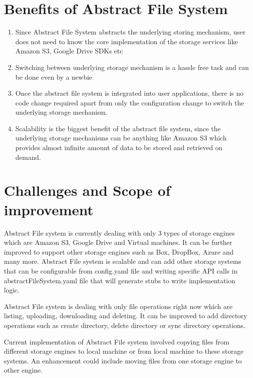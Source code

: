 \section{Benefits of Abstract File System}
\begin{enumerate}
    \item Since Abstract File System abstracts the underlying storing 
mechanism, user does not need to know the core implementation of the storage 
services like Amazon S3, Google Drive SDKs etc
    
    \item Switching between underlying storage mechanism is a hassle free task 
and can be done even by a newbie
    
    \item Once the abstract file system is integrated into user 
applications, there is no code change required apart from only the 
configuration change to switch the underlying storage mechanism.
    
    \item Scalability is the biggest benefit of the abstract file system, 
since the underlying storage mechanisms can be anything like Amazon S3 which 
provides almost infinite amount of data to be stored and retrieved on demand.
    
\end{enumerate}

\section{Challenges and Scope of improvement}
Abstract File system is currently dealing with only 3 types of storage engines 
which are Amazon S3, Google Drive and Virtual machines. It can be further 
improved to support other storage engines such as Box, DropBox, Azure and many 
more. Abstract File system is scalable and can add other storage systems that 
can be configurable from config.yaml file and writing specific API calls in 
abstractFileSystem.yaml file that will generate stubs to write implementation 
logic. 


Abstract File system is dealing with only file operations right now which are 
listing, uploading, downloading and deleting. It can be improved to add 
directory operations such as create directory, delete directory or sync 
directory operations. 


Current implementation of Abstract File system involved copying files from 
different storage engines to local machine or from local machine to these 
storage systems. An enhancement could include moving files from one storage 
engine to other engine. 



